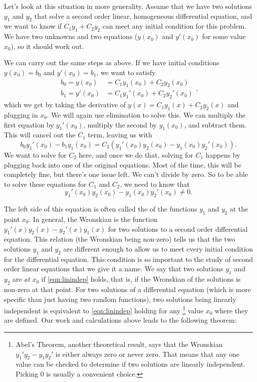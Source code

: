 \documentclass{ximera}
\begin{document}
Let's look at this situation in more generality. Assume that we have two solutions $y_1$ and $y_2$ that solve a second order linear, homogeneous differential equation, and we want to know if $C_1y_1 + C_2y_2$ can meet any initial condition for this problem. We have two unknowns and two equations ($y(x_0)$ and $y'(x_0)$ for some value $x_0$), so it should work out. 

We can carry out the same steps as above. If we have initial conditions $y(x_0) = b_0$ and $y'(x_0) = b_1$, we want to satisfy
\begin{equation*}
    \begin{split}
        b_0 = y(x_0) &= C_1y_1(x_0) + C_2y_2(x_0) \\
        b_1 = y'(x_0) &= C_1y_1'(x_0)  + C_2y_2'(x_0)
    \end{split},
\end{equation*}
which we get by taking the derivative of $y(x) = C_1y_1(x) + C_2y_2(x)$ and plugging in $x_0$. We will again use elimination to solve this. We can multiply the first equation by $y_1'(x_0)$, multiply the second by $y_1(x_0)$, and subtract them. This will cancel out the $C_1$ term, leaving us with 
\begin{equation*}
    b_0y_1'(x_0) - b_1y_1(x_0) = C_2(y_1'(x_0)y_2(x_0) - y_1(x_0)y_2'(x_0)).
\end{equation*}
We want to solve for $C_2$ here, and once we do that, solving for $C_1$ happens by plugging back into one of the original equations. Most of the time, this will be completely fine, but there's one issue left. We can't divide by zero. So to be able to solve these equations for $C_1$ and $C_2$, we need to know that
\begin{equation}
    y_1'(x_0)y_2(x_0) - y_1(x_0)y_2'(x_0) \neq 0.
    \label{eqn:linindep}
\end{equation}

The left side of this equation is often called the \emph{} of the functions $y_1$ and $y_2$ at the point $x_0$. In general, the Wronskian is the function $y_1'(x)y_2(x) - y_2'(x)y_1(x)$ for two solutions to a second order differential equation. This relation (the Wronskian being non-zero) tells us that the two solutions $y_1$ and $y_2$ are different enough to allow us to meet every initial condition for the differential equation. This condition is so important to the study of second order linear equations that we give it a name. We say that two solutions $y_1$ and $y_2$ are \emph{ at $x_0$} if \eqref{eqn:linindep} holds, that is, if the Wronskian of the solutions is non-zero at that point. For two solutions of a differential equation (which is more specific than just having two random functions), two solutions being linearly independent is equivalent to \ref{eqn:linindep} holding for any%
\footnote{Abel's Theorem, another theoretical result, says that the Wronskian $y_1'y_2 - y_1y_2'$ is either always zero or never zero. That means that any one value can be checked to determine if two solutions are linearly independent. Picking $0$ is usually a convenient choice.}
value $x_0$ where they are defined. Our work and calculations above leads to the following theorem: 
\end{document}
